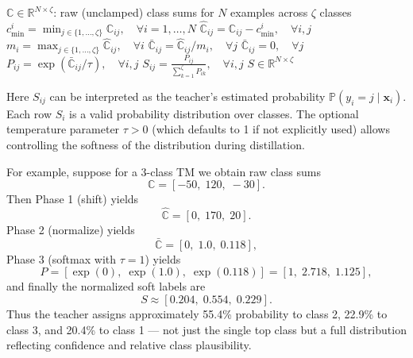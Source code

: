 \documentclass[sn-mathphys-num]{sn-jnl}%
\theoremstyle{thmstyleone}%
\theoremstyle{thmstyletwo}%
\theoremstyle{thmstylethree}%
\providecommand{\DIFaddend}{} %
\DeclareRobustCommand{\DIFaddend}{\DIFOaddend \let\includegraphics\DIFOincludegraphics} %
\begin{document}
\begin{algorithm}[h]
\DIFaddend \caption{Generate Soft Labels from Tsetlin Machine Class Sums}
\label{algo:soft-labels}
\begin{algorithmic}[1]
\Require $\mathbb{C} \in \mathbb{R}^{N \times \zeta}$: raw (unclamped) class sums for $N$ examples across $\zeta$ classes
  \State $c_{\min}^i = \min_{j \in \{1,\dots,\zeta\}} \mathbb{C}_{ij}, \quad \forall i = 1,\dots,N$
  \State $\hat{\mathbb{C}}_{ij} = \mathbb{C}_{ij} - c_{\min}^i, \quad \forall i,j$  
  \\
  \State $m_i = \max_{j \in \{1,\dots,\zeta\}} \hat{\mathbb{C}}_{ij}, \quad \forall i$
    \State $\bar{\mathbb{C}}_{ij} = \hat{\mathbb{C}}_{ij} / m_i, \quad \forall j$  
  \Else
    \State $\bar{\mathbb{C}}_{ij} = 0, \quad \forall j$  
  \EndIf
  \\
  \State $P_{ij} = \exp\left(\bar{\mathbb{C}}_{ij} / \tau\right), \quad \forall i,j$  %
  \State $S_{ij} = \displaystyle \frac{P_{ij}}{\sum_{k=1}^{\zeta} P_{ik}}, \quad \forall i,j$
  \State \Return $S \in \mathbb{R}^{N \times \zeta}$
\EndFunction
\end{algorithmic}
\end{algorithm}

Here $S_{ij}$ can be interpreted as the teacher’s estimated probability $\mathbb{P}(y_i = j \mid \mathbf{x}_i)$. Each row $S_i$ is a valid probability distribution over classes. The optional temperature parameter $\tau > 0$ (which defaults to 1 if not explicitly used) allows controlling the softness of the distribution during distillation.

For example, suppose for a 3-class TM we obtain raw class sums  
\[
\mathbb{C} = [-50,\;120,\;-30].
\]  
Then Phase 1 (shift) yields  
\[
\hat{\mathbb{C}} = [0,\;170,\;20].
\]  
Phase 2 (normalize) yields  
\[
\bar{\mathbb{C}} = [0,\;1.0,\;0.118],
\]  
Phase 3 (softmax with $\tau = 1$) yields  
\[
P = [\exp(0),\;\exp(1.0),\;\exp(0.118)] = [1,\;2.718,\;1.125],
\]  
and finally the normalized soft labels are  
\[
S \approx [0.204,\;0.554,\;0.229].
\]  
Thus the teacher assigns approximately 55.4\% probability to class 2, 22.9\% to class 3, and 20.4\% to class 1 — not just the single top class but a full distribution reflecting confidence and relative class plausibility.
\end{document}
